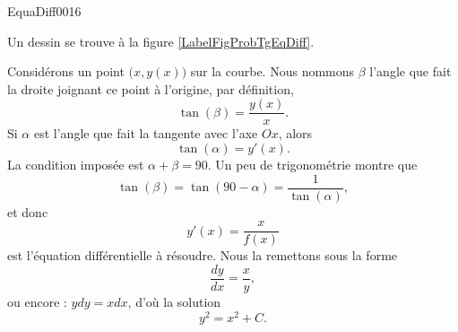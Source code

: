 \begin{corrige}{EquaDiff0016}



Un dessin se trouve à la figure \ref{LabelFigProbTgEqDiff}.
\newcommand{\CaptionFigProbTgEqDiff}{La tengente et la droite qui lie à l'origine pour l'exercice \ref{exoEquaDiff0016}.}

Considérons un point $\big( x,y(x) \big)$ sur la courbe. Nous nommons $\beta$ l'angle que fait la droite joignant ce point à l'origine, par définition,
\begin{equation}
	\tan(\beta)=\frac{ y(x) }{ x }.
\end{equation}
Si $\alpha$ est l'angle que fait la tangente avec l'axe $Ox$, alors 
\begin{equation}
	\tan(\alpha)=y'(x).
\end{equation}
La condition imposée est $\alpha+\beta=90$. Un peu de trigonométrie montre que
\begin{equation}
	\tan(\beta)=\tan(90-\alpha)=\frac{1}{ \tan(\alpha) },
\end{equation}
et donc
\begin{equation}
	y'(x)=\frac{ x }{ f(x) }
\end{equation}
est l'équation différentielle à résoudre. Nous la remettons sous la forme
\begin{equation}
	\frac{ dy }{ dx }=\frac{ x }{ y }, 
\end{equation}
ou encore : $ydy=xdx$, d'où la solution
\begin{equation}
	y^2=x^2+C.
\end{equation}


\end{corrige}
